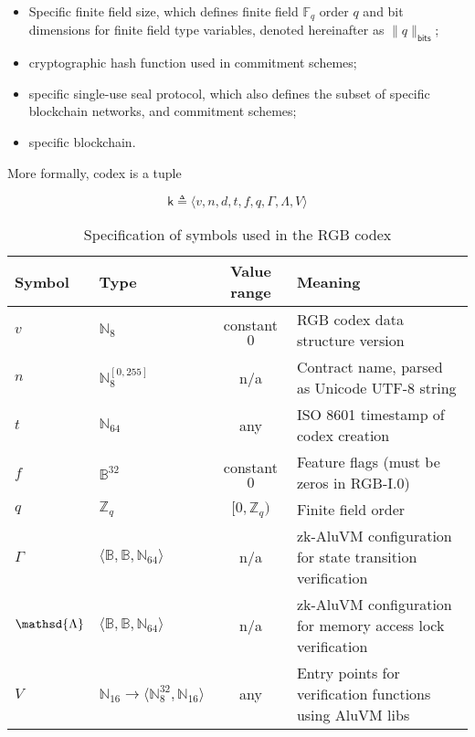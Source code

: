 \documentclass[a4paper]{article}
\begin{document}
\begin{multicols}{2}
\begin{itemize}
\item Specific finite field size, which defines finite field $\mathbb{F}_q$ order $q$ and
  bit dimensions for finite field type variables, denoted hereinafter as $\|q\|_\mathsf{bits}$;
\item cryptographic hash function used in commitment schemes;
\item specific single-use seal protocol, which also defines the subset of specific blockchain networks,
  and commitment schemes;
\item specific blockchain.
\end{itemize}

More formally, codex is a tuple

\begin{equation}
\mathsf{k} \triangleq \langle v, n, d, t, f, q, \mathsf{\Gamma}, \mathsf{\Lambda}, V \rangle
\end{equation}

\end{multicols}
\begin{table}[h]
\centering
\caption{Specification of symbols used in the RGB codex}\label{tab:codex}
\begin{tabular}{ l l c p{8cm} }
\toprule
Symbol & Type & Value range & Meaning \\
\midrule
$v$ & $\mathbb{N}_8$ & constant $0$ & RGB codex data structure version \\
$n$ & $\mathbb{N}_8^{[0, 255]}$ & n/a & Contract name, parsed as Unicode UTF-8 string \\
$t$ & $\mathbb{N}_{64}$ & any & ISO 8601 timestamp of codex creation \\
$f$ & $\mathbb{B}^{32}$ & constant $0$ & Feature flags (must be zeros in RGB-I.0) \\
$q$ & $\mathbb{Z}_q$ & $[0, \mathbb{Z}_q)$ & Finite field order \\
$\mathsf{\Gamma}$ & $\langle \mathbb{B}, \mathbb{B}, \mathbb{N}_{64} \rangle$ & n/a &  zk-AluVM configuration for state transition verification \\
$\mathsd{\Lambda}$ & $\langle \mathbb{B}, \mathbb{B}, \mathbb{N}_{64} \rangle$ & n/a & zk-AluVM configuration for memory access lock verification \\
$V$ & $\mathbb{N}_{16} \rightarrow \langle \mathbb{N}_8^{32}, \mathbb{N}_{16} \rangle$ & any & Entry points for verification functions using AluVM libs \\
\bottomrule
\end{tabular}
\end{table}
\end{document}
